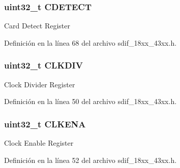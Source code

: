 \subsubsection[{\texorpdfstring{C\+D\+E\+T\+E\+CT}{CDETECT}}]{ uint32\+\_\+t C\+D\+E\+T\+E\+CT}\hypertarget{struct_l_p_c___s_d_m_m_c___t_a12e866c73a9d56e6f7060c09bed11d67}{}\label{struct_l_p_c___s_d_m_m_c___t_a12e866c73a9d56e6f7060c09bed11d67}
Card Detect Register 

Definición en la línea 68 del archivo sdif\+\_\+18xx\+\_\+43xx.\+h.

\subsubsection[{\texorpdfstring{C\+L\+K\+D\+IV}{CLKDIV}}]{ uint32\+\_\+t C\+L\+K\+D\+IV}\hypertarget{struct_l_p_c___s_d_m_m_c___t_a2a33dba1349d1ebe45133cb2789a5307}{}\label{struct_l_p_c___s_d_m_m_c___t_a2a33dba1349d1ebe45133cb2789a5307}
Clock Divider Register 

Definición en la línea 50 del archivo sdif\+\_\+18xx\+\_\+43xx.\+h.

\subsubsection[{\texorpdfstring{C\+L\+K\+E\+NA}{CLKENA}}]{ uint32\+\_\+t C\+L\+K\+E\+NA}\hypertarget{struct_l_p_c___s_d_m_m_c___t_a46083fe8ee07b66ddbe4bc7873cc4d63}{}\label{struct_l_p_c___s_d_m_m_c___t_a46083fe8ee07b66ddbe4bc7873cc4d63}
Clock Enable Register 

Definición en la línea 52 del archivo sdif\+\_\+18xx\+\_\+43xx.\+h.

